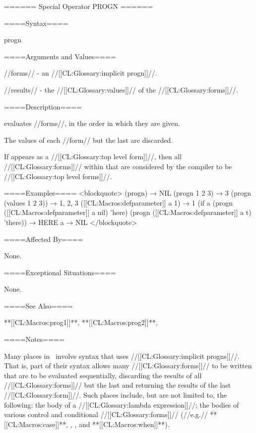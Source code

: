 ====== Special Operator PROGN ======

====Syntax====

\DefspecWithValues progn {} {}

====Arguments and Values====

//forms// - an //[[CL:Glossary:implicit progn]]//.

//results// - the //[[CL:Glossary:values]]// of the //[[CL:Glossary:forms]]//.

====Description====

 evaluates //forms//, in the order in which they are given.

The values of each //form// but the last are discarded.

If  appears as a //[[CL:Glossary:top level form]]//, then all //[[CL:Glossary:forms]]// within that  are considered by the compiler to be //[[CL:Glossary:top level forms]]//.

====Examples==== <blockquote> (progn) → NIL (progn 1 2 3) → 3 (progn (values 1 2 3)) → 1, 2, 3 ([[CL:Macros:defparameter]] a 1) → 1 (if a (progn ([[CL:Macros:defparameter]] a nil) 'here) (progn ([[CL:Macros:defparameter]] a t) 'there)) → HERE a → NIL </blockquote>

====Affected By====

None.

====Exceptional Situations====

None.

====See Also====

**[[CL:Macros:prog1]]**, **[[CL:Macros:prog2]]**, {\secref\Evaluation}

====Notes====

Many places in \clisp\ involve syntax that uses //[[CL:Glossary:implicit progns]]//. That is, part of their syntax allows many //[[CL:Glossary:forms]]// to be written that are to be evaluated sequentially, discarding the results of all //[[CL:Glossary:forms]]// but the last and returning the results of the last //[[CL:Glossary:form]]//. Such places include, but are not limited to, the following: the body of a //[[CL:Glossary:lambda expression]]//; the bodies of various control and conditional //[[CL:Glossary:forms]]// (//e.g.// **[[CL:Macros:case]]**, , , and **[[CL:Macros:when]]**).

